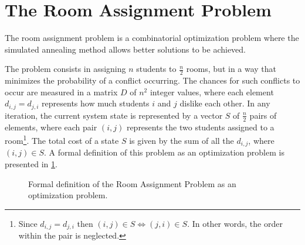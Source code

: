 \section{The Room Assignment Problem}
The room assignment problem is a combinatorial optimization problem where the simulated annealing method allows better solutions to be achieved.

The problem consists in assigning $n$ students to $\frac{n}{2}$ rooms, but in a way that minimizes the probability of a conflict occurring. The chances for such conflicts to occur are measured in a matrix $D$ of $n^{2}$ integer values, where each element $d_{i,j} = d_{j,i}$ represents how much students $i$ and $j$ dislike each other. In any iteration, the current system state is represented by a vector $S$ of $\frac{n}{2}$ pairs of elements, where each pair $(i,j)$ represents the two students assigned to a room\footnote{Since $d_{i,j}=d_{j,i}$ then $(i,j)\in S\Leftrightarrow(j,i)\in S$. In other words, the order within the pair is neglected.}. The total cost of a state $S$ is given by the sum of all the $d_{i,j}$, where $(i,j)\in S$. A formal definition of this problem as an optimization problem is presented in \cref{fig:formaldef}.

\begin{figure}
	\begin{center}
	\end{center}
	\caption{Formal definition of the Room Assignment Problem as an optimization problem.}
	\label{fig:formaldef}
\end{figure}

